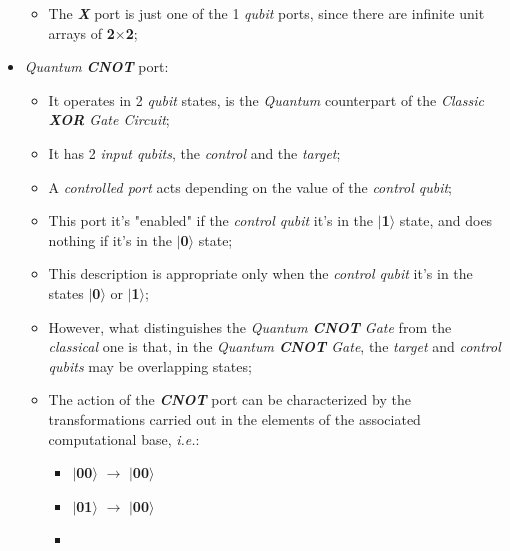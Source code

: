 \documentclass[conference]{IEEEtran}
\begin{document}
\begin{itemize}
\begin{itemize}
        \item The \textit{\textbf{X}} port is just one of the 1 \textit{qubit} ports, since there are infinite unit arrays of \textbf{2$\times$2};
    \end{itemize}
    \item \textit{Quantum} \textit{\textbf{CNOT}} port:
        \begin{itemize}
            \item It operates in 2 \textit{qubit} states, is the \textit{Quantum} counterpart of the \textit{Classic \textbf{XOR} Gate Circuit};
            \item It has 2 \textit{input qubits}, the \textit{control} and the \textit{target};
            \item A \textit{controlled port} acts depending on the value of the \textit{control qubit};
            \item This port it's "enabled" if the \textit{control qubit} it's in the $\mid$\textbf{1}$\rangle$ state, and does nothing if it's in the $\mid$\textbf{0}$\rangle$ state;
            \item This description is appropriate only when the \textit{control qubit} it's in the states $\mid$\textbf{0}$\rangle$ or $\mid$\textbf{1}$\rangle$;
            \item However, what distinguishes the \textit{Quantum \textbf{CNOT} Gate} from the \textit{classical} one is that, in the \textit{Quantum \textbf{CNOT} Gate}, the \textit{target} and \textit{control qubits} may be overlapping states;
            \item The action of the \textit{\textbf{CNOT}} port can be characterized by the transformations carried out in the elements of the associated computational base, \textit{i.e.}:
            \vspace{4pt}
            \begin{itemize}
                \item 
                    \begin{center}
                        $\mid$\textbf{00}$\rangle$ $\rightarrow$ $\mid$\textbf{00}$\rangle$
                    \end{center}
                \item 
                    \begin{center}
                        $\mid$\textbf{01}$\rangle$ $\rightarrow$ $\mid$\textbf{00}$\rangle$
                    \end{center}
                \item 

\end{itemize}
\end{itemize}
\end{itemize}
\end{document}
